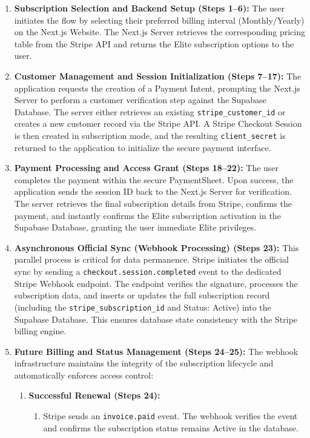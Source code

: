 \begin{enumerate}
    \item \textbf{Subscription Selection and Backend Setup (Steps 1--6):} The user initiates the flow by selecting their preferred billing interval (Monthly/Yearly) on the Next.js Website. The Next.js Server retrieves the corresponding pricing table from the Stripe API and returns the Elite subscription options to the user.
    \item \textbf{Customer Management and Session Initialization (Steps 7--17):} The application requests the creation of a Payment Intent, prompting the Next.js Server to perform a customer verification step against the Supabase Database. The server either retrieves an existing \texttt{stripe\_customer\_id} or creates a new customer record via the Stripe API. A Stripe Checkout Session is then created in subscription mode, and the resulting \texttt{client\_secret} is returned to the application to initialize the secure payment interface.
    \item \textbf{Payment Processing and Access Grant (Steps 18--22):} The user completes the payment within the secure PaymentSheet. Upon success, the application sends the session ID back to the Next.js Server for verification. The server retrieves the final subscription details from Stripe, confirms the payment, and instantly confirms the Elite subscription activation in the Supabase Database, granting the user immediate Elite privileges.
    \item \textbf{Asynchronous Official Sync (Webhook Processing) (Steps 23):} This parallel process is critical for data permanence. Stripe initiates the official sync by sending a \texttt{checkout.session.completed} event to the dedicated Stripe Webhook endpoint. The endpoint verifies the signature, processes the subscription data, and inserts or updates the full subscription record (including the \texttt{stripe\_subscription\_id} and Status: Active) into the Supabase Database. This ensures database state consistency with the Stripe billing engine.
    \newpage
    \item \textbf{Future Billing and Status Management (Steps 24--25):} The webhook infrastructure maintains the integrity of the subscription lifecycle and automatically enforces access control:
    \begin{enumerate}
        \item \textbf{Successful Renewal (Steps 24):} 
        \begin{enumerate}
            \item Stripe sends an \texttt{invoice.paid} event. The webhook verifies the event and confirms the subscription status remains Active in the database.

\end{enumerate}
\end{enumerate}
\end{enumerate}
